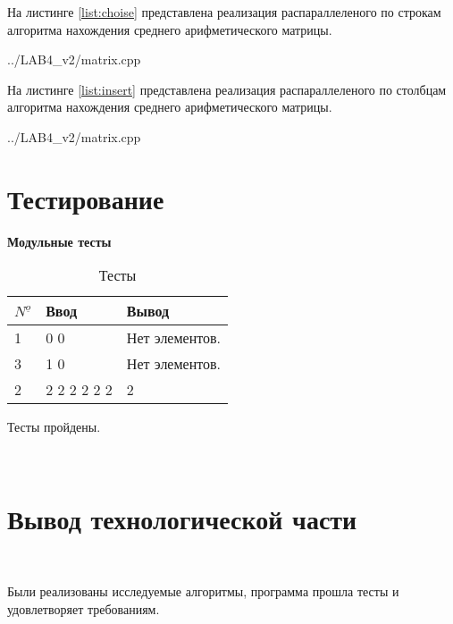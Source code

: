 На листинге \ref{list:choise} представлена реализация распараллеленого по строкам алгоритма нахождения среднего арифметического матрицы.

\begin{lstinputlisting}
    [caption = {Реализация распараллеленого по строкам алгоритма нахождения среднего арифметического матрицы},
    label = {list:choise},
    linerange={56-67},
    ]{../LAB4_v2/matrix.cpp}
\end{lstinputlisting}

На листинге \ref{list:insert} представлена реализация распараллеленого по столбцам алгоритма нахождения среднего арифметического матрицы.

\begin{lstinputlisting}
    [caption = {Реализация распараллеленого по столбцам алгоритма нахождения среднего арифметического матрицы},
    label = {list:insert},
    linerange={68-79},
    ]{../LAB4_v2/matrix.cpp}
\end{lstinputlisting}

\section{Тестирование}\label{TestResult}


\textbf{Модульные тесты}


\begin{table}[ht]
    \caption{Тесты}
    \centering
\begin{tabular}{ l | l | l }
    ${N^{\underline{o}}}$ & Ввод & Вывод   \\ \hline \hline
    1 &
    0 0 
    &
    Нет элементов.
    \\  \hline 

    3 &
    1 0
    &
    Нет элементов.
    \\  \hline 
    
    2 &
    2 2 2 2 2 2 
    &
    2
    \\ 


\end{tabular}
\label{tab:matrixMultiply}
\end{table}

Тесты пройдены.

~\section{Вывод технологической части}\label{TechResults}~

Были реализованы исследуемые алгоритмы, программа прошла тесты и удовлетворяет требованиям.

